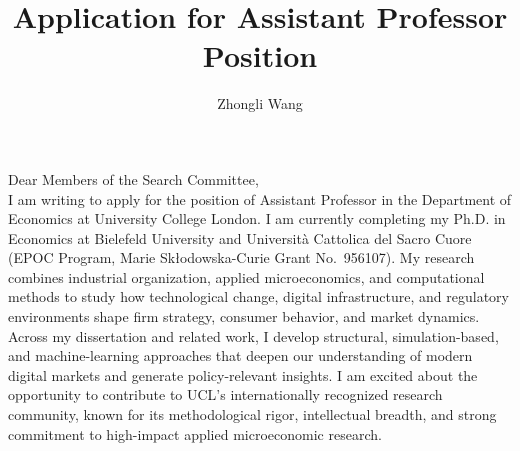 \documentclass{nfr}
\title{Application for Assistant Professor Position}
\author{Zhongli Wang}
\begin{document}

% 
% 
% 
% 


\maketitle


\noindent Dear Members of the Search Committee,\\[0.2cm]

I am writing to apply for the position of Assistant Professor in the Department of Economics at University College London. 
I am currently completing my Ph.D. in Economics at Bielefeld University and Università Cattolica del Sacro Cuore (EPOC Program, Marie Skłodowska-Curie Grant No.~956107). 
My research combines industrial organization, applied microeconomics, and computational methods to study how technological change, digital infrastructure, and regulatory environments shape firm strategy, consumer behavior, and market dynamics. 
Across my dissertation and related work, I develop structural, simulation-based, and machine-learning approaches that deepen our understanding of modern digital markets and generate policy-relevant insights. 
I am excited about the opportunity to contribute to UCL’s internationally recognized research community, known for its methodological rigor, intellectual breadth, and strong commitment to high-impact applied microeconomic research.\\
\end{document}
